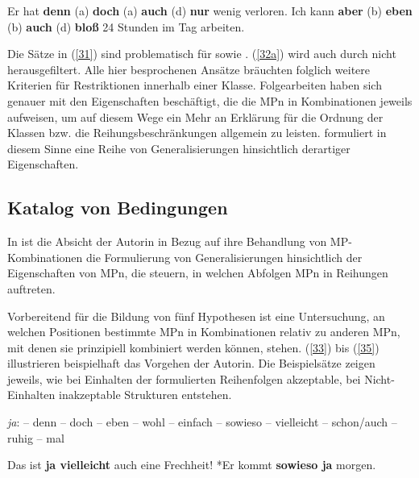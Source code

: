 \begin{exe}
	\ex\label{32} 
		\begin{xlist}	
			\ex\label{32a} Er hat \textbf{denn} (a) \textbf{doch} (a) \textbf{auch} (d) \textbf{nur} wenig verloren.
			\ex\label{32b} Ich kann \textbf{aber} (b) \textbf{eben} (b) \textbf{auch} (d) \textbf{bloß} 24 Stunden im Tag 						arbeiten.
		\end{xlist}
		\hfill\hbox {\citet[248-249]{Abraham1995}}
\end{exe}
Die Sätze in (\ref{31}) sind problematisch für \citet{Engel1968} sowie \citet{Helbig1981}. (\ref{32a}) wird auch durch \citet{Thurmair1991} nicht herausgefiltert. Alle hier bespro\-chenen Ansätze bräuchten folglich weitere Kriterien für Restriktionen innerhalb einer Klasse. 
\noindent
Folgearbeiten haben sich genauer mit den Eigenschaften beschäftigt, die die MPn in Kombinationen jeweils aufweisen, um auf diesem Wege ein Mehr an Erklärung für die Ordnung der Klassen bzw. die Reihungsbeschränkungen allgemein zu leisten. \citet{Thurmair1989, Thurmair1991} formuliert in diesem Sinne eine Reihe von Generalisie\-rungen hinsichtlich derartiger Eigenschaften.

\subsection{Katalog von Bedingungen}
\label{sec:katalog}
In \citet{Thurmair1989, Thurmair1991} ist die Absicht der Autorin in Bezug auf ihre Behandlung von MP-Kombinationen die Formulierung von Generalisierungen hinsichtlich der Eigenschaften von MPn, die steuern, in welchen Abfolgen MPn in Reihungen auftreten. 

Vorbereitend für die Bildung von fünf Hypothesen ist eine Untersuchung, an welchen Positionen bestimmte MPn in Kombinationen relativ zu anderen MPn, mit denen sie prinzipiell kombiniert werden können, stehen. (\ref{33}) bis (\ref{35}) illustrieren beispielhaft das Vorgehen der Autorin. Die Beispielsätze zeigen jeweils, wie bei Einhalten der formulierten Reihenfolgen akzeptable, bei Nicht-Einhalten inakzeptable Strukturen entstehen.
	
\begin{exe}
	\ex\label{33} \textit{ja}:  – denn – doch – eben – wohl – einfach – sowieso – vielleicht – schon/auch – ruhig – mal
		\begin{xlist}	
			\ex\label{33a} Das ist \textbf{ja vielleicht} auch eine Frechheit!
			\ex\label{33b} *Er kommt \textbf{sowieso ja} morgen.
		\end{xlist}
\end{exe}
	
